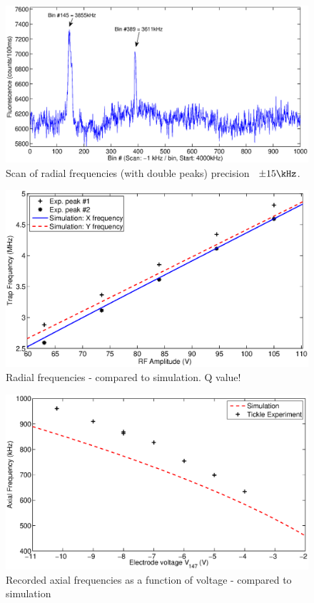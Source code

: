 \begin{figure}[h!t]
\centering
\includegraphics[width=14.5cm]{chapter6/tickle/ticklescan}
\caption[]{Scan of radial frequencies (with double peaks) precision ~$\pm 15 \kHz$.}
\label{ticklescan}
\end{figure} 

\begin{figure}[h!t]
\centering
\includegraphics[width=14.5cm]{chapter6/tickle/radialtickle}
\caption[]{Radial frequencies - compared to simulation. Q value!}
\label{radialtickle}
\end{figure} 


\begin{figure}[h!t]
\centering
\includegraphics[width=14.5cm]{chapter6/tickle/axialtickle}
\caption[]{Recorded axial frequencies as a function of voltage - compared to simulation}
\label{axialtickle}
\end{figure} 



